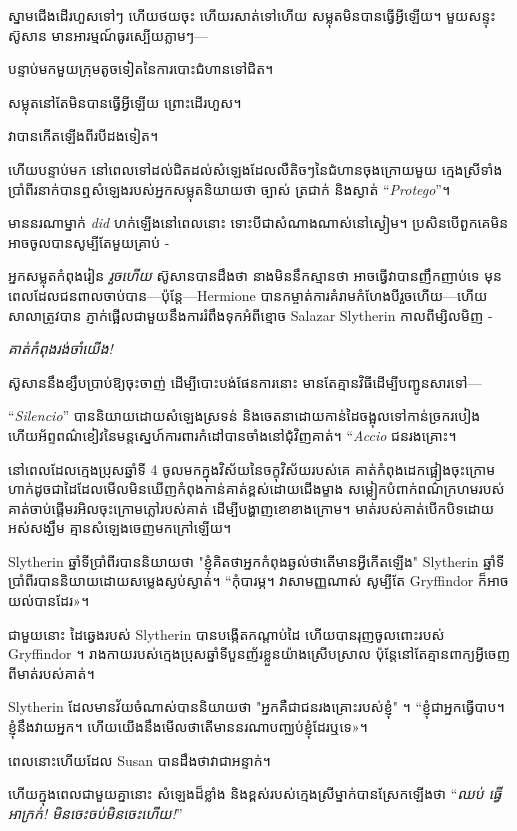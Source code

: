 {{{ស្នាម​ជើង​ដើរ​ហួស​ទៅ​ៗ ហើយ​ថយ​ចុះ ហើយ​រសាត់​ទៅ​ហើយ សម្លុត​មិន​បាន​ធ្វើ​អ្វី​ឡើយ។ មួយសន្ទុះ ស៊ូសាន មានអារម្មណ៍ធូរស្បើយភ្លាមៗ—

បន្ទាប់​មក​មួយ​ក្រុម​តូច​ទៀត​នៃ​ការ​បោះ​ជំហាន​ទៅ​ជិត​។

សម្លុត​នៅតែ​មិន​បាន​ធ្វើ​អ្វី​ឡើយ ព្រោះ​ដើរ​ហួស។

វាបានកើតឡើងពីរបីដងទៀត។

ហើយបន្ទាប់មក នៅពេលទៅដល់ជិតដល់សំឡេងដែលលឺតិចៗនៃជំហានចុងក្រោយមួយ ក្មេងស្រីទាំងប្រាំពីរនាក់បានឮសំឡេងរបស់អ្នកសម្លុតនិយាយថា ច្បាស់ ត្រជាក់ និងស្ងាត់ “\emph{Protego}”។

មាននរណាម្នាក់ \emph{did} ហក់ឡើងនៅពេលនោះ ទោះបីជាសំណាងណាស់នៅស្ងៀម។ ប្រសិនបើពួកគេមិនអាចចូលបានសូម្បីតែមួយគ្រាប់ -

អ្នកសម្លុតកំពុងរៀន \emph{រួចហើយ} ស៊ូសានបានដឹងថា នាងមិននឹកស្មានថា \SPHEW អាចធ្វើវាបានញឹកញាប់ទេ មុនពេលដែលជនពាលចាប់បាន—ប៉ុន្តែ—Hermione បានកម្ចាត់ការគំរាមកំហែងបីរួចហើយ—ហើយសាលាត្រូវបាន ភ្ញាក់ផ្អើលជាមួយនឹងការរំពឹងទុកអំពីខ្មោច Salazar Slytherin កាលពីម្សិលមិញ -

\emph{គាត់កំពុងរង់ចាំយើង!}

ស៊ូសាននឹងខ្សឹបប្រាប់ឱ្យចុះចាញ់ ដើម្បីបោះបង់ផែនការនោះ មានតែគ្មានវិធីដើម្បីបញ្ជូនសារទៅ—

“\emph{Silencio}” បាននិយាយដោយសំឡេងស្រទន់ និងចេតនាដោយកាន់ដៃចង្អុលទៅកាន់ច្រករបៀង ហើយអ័ព្ទពណ៌ខៀវនៃមន្តស្នេហ៍ការពារកំដៅបានចាំងនៅជុំវិញគាត់។ “\emph{Accio} ជនរងគ្រោះ។

នៅពេលដែលក្មេងប្រុសឆ្នាំទី 4 ចូលមកក្នុងវិស័យនៃចក្ខុវិស័យរបស់គេ គាត់កំពុងដេកផ្អៀងចុះក្រោម ហាក់ដូចជាដៃដែលមើលមិនឃើញកំពុងកាន់គាត់ខ្ពស់ដោយជើងម្ខាង សម្លៀកបំពាក់ពណ៌ក្រហមរបស់គាត់ចាប់ផ្តើមរអិលចុះក្រោមភ្លៅរបស់គាត់ ដើម្បីបង្ហាញខោខាងក្រោម។ មាត់​របស់​គាត់​បើក​បិទ​ដោយ​អស់​សង្ឃឹម គ្មាន​សំឡេង​ចេញ​មក​ក្រៅ​ឡើយ។

Slytherin ឆ្នាំទីប្រាំពីរបាននិយាយថា "ខ្ញុំគិតថាអ្នកកំពុងឆ្ងល់ថាតើមានអ្វីកើតឡើង" Slytherin ឆ្នាំទីប្រាំពីរបាននិយាយដោយសម្លេងស្ងប់ស្ងាត់។ “កុំបារម្ភ។ វាសាមញ្ញណាស់ សូម្បីតែ Gryffindor ក៏អាចយល់បានដែរ»។

ជាមួយ​នោះ ដៃ​ឆ្វេង​របស់ Slytherin បាន​បង្កើត​កណ្តាប់ដៃ ហើយ​បាន​រុញ​ចូល​ពោះ​របស់ Gryffindor ។ រាងកាយ​របស់​ក្មេង​ប្រុស​ឆ្នាំ​ទី​បួន​ញ័រ​ខ្លួន​យ៉ាង​ស្រើបស្រាល ប៉ុន្តែ​នៅ​តែ​គ្មាន​ពាក្យ​អ្វី​ចេញ​ពី​មាត់​របស់​គាត់។

Slytherin ដែលមានវ័យចំណាស់បាននិយាយថា "អ្នកគឺជាជនរងគ្រោះរបស់ខ្ញុំ" ។ “ខ្ញុំ​ជា​អ្នក​ធ្វើ​បាប។ ខ្ញុំនឹងវាយអ្នក។ ហើយ​យើង​នឹង​មើល​ថា​តើ​មាន​នរណា​បញ្ឈប់​ខ្ញុំ​ដែរ​ឬ​ទេ»។

ពេល​នោះ​ហើយ​ដែល Susan បាន​ដឹង​ថា​វា​ជា​អន្ទាក់។

ហើយក្នុងពេលជាមួយគ្នានោះ សំឡេងដ៏ខ្លាំង និងខ្ពស់របស់ក្មេងស្រីម្នាក់បានស្រែកឡើងថា “\emph{ឈប់ ធ្វើអាក្រក់! មិនចេះចប់មិនចេះហើយ!}”

}}}

